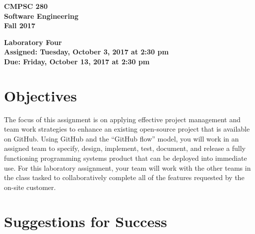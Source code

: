 \documentclass[11pt]{article}
\newcommand{\assignmentduedate}{October 13}
\newcommand{\assignmentassignedate}{October 3}
\newcommand{\assignmentnumber}{Four}
\newcommand{\labyear}{2017}
\newcommand{\labday}{Tuesday}
\newcommand{\labdueday}{Friday}
\newcommand{\labtime}{2:30 pm}
\newcommand{\assigneddate}{Assigned: \labday, \assignmentassignedate, \labyear{} at \labtime{}}
\newcommand{\duedate}{Due: \labdueday, \assignmentduedate, \labyear{} at \labtime{}}
\newcommand{\labtitle}[1]
{
  \begin{center}
    \begin{center}
      \bf
      CMPSC 280\\Software Engineering\\
      Fall 2017\\
      \medskip
    \end{center}
    \bf
    #1
  \end{center}
}
\begin{document}
\thispagestyle{empty}

\labtitle{Laboratory \assignmentnumber{} \\ \assigneddate{} \\ \duedate{}}

\section*{Objectives}

The focus of this assignment is on applying effective project management and team work strategies to enhance an existing
open-source project that is available on GitHub. Using GitHub and the ``GitHub flow'' model, you will work in an
assigned team to specify, design, implement, test, document, and release a fully functioning programming systems product
that can be deployed into immediate use. For this laboratory assignment, your team will work with the other teams in the
class tasked to collaboratively complete all of the features requested by the on-site customer.

\section*{Suggestions for Success}
\end{document}

